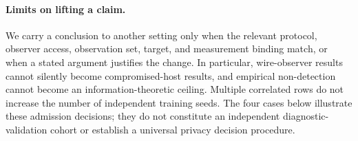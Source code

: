 \paragraph{Limits on lifting a claim.}
We carry a conclusion to another setting only when the relevant protocol,
observer access, observation set, target, and measurement binding match, or
when a stated argument justifies the change. In particular, wire-observer
results cannot silently become compromised-host results, and empirical
non-detection cannot become an information-theoretic ceiling. Multiple
correlated rows do not increase the number of independent training seeds.
The four cases below illustrate these admission decisions; they do not
constitute an independent diagnostic-validation cohort or establish a
universal privacy decision procedure.
